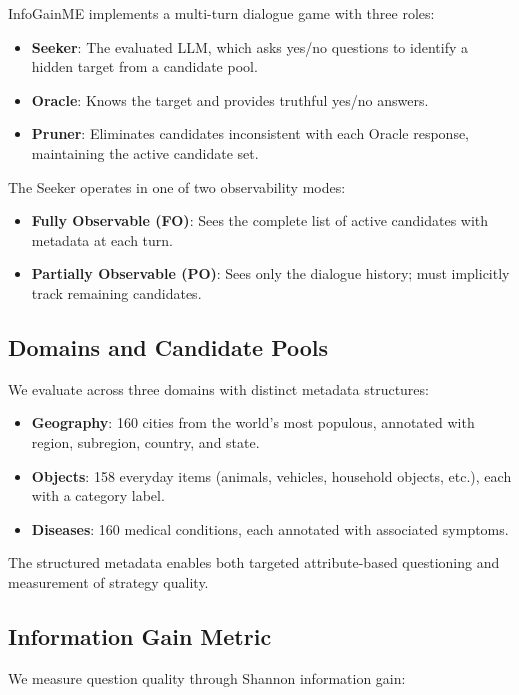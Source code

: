 \documentclass[11pt]{article}
\begin{document}
InfoGainME implements a multi-turn dialogue game with three roles:

\begin{itemize}
    \item \textbf{Seeker}: The evaluated LLM, which asks yes/no questions to identify a hidden target from a candidate pool.
    \item \textbf{Oracle}: Knows the target and provides truthful yes/no answers.
    \item \textbf{Pruner}: Eliminates candidates inconsistent with each Oracle response, maintaining the active candidate set.
\end{itemize}

The Seeker operates in one of two observability modes:
\begin{itemize}
    \item \textbf{Fully Observable (FO)}: Sees the complete list of active candidates with metadata at each turn.
    \item \textbf{Partially Observable (PO)}: Sees only the dialogue history; must implicitly track remaining candidates.
\end{itemize}

\subsection{Domains and Candidate Pools}

We evaluate across three domains with distinct metadata structures:

\begin{itemize}
    \item \textbf{Geography}: 160 cities from the world's most populous, annotated with region, subregion, country, and state.
    \item \textbf{Objects}: 158 everyday items (animals, vehicles, household objects, etc.), each with a category label.
    \item \textbf{Diseases}: 160 medical conditions, each annotated with associated symptoms.
\end{itemize}

The structured metadata enables both targeted attribute-based questioning and measurement of strategy quality.

\subsection{Information Gain Metric}

We measure question quality through Shannon information gain:
\end{document}

